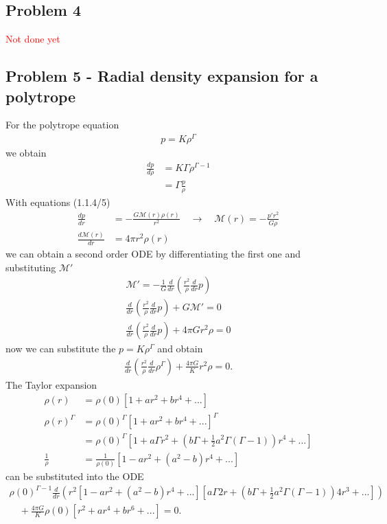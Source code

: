 \documentclass[10pt,a4paper]{book}
\theoremstyle{definition}
\begin{document}
\subsection{Problem 4}
\textcolor{red}{Not done yet}

\subsection{Problem 5 - Radial density expansion for a polytrope}
For the polytrope equation 
\begin{align}
    p=K\rho^\Gamma
\end{align}
we obtain
\begin{align}
    \frac{dp}{d\rho}&=K\Gamma\rho^{\Gamma-1}\\
    &=\Gamma\frac{p}{\rho}
\end{align}
With equations (1.1.4/5)
\begin{align}
    \frac{dp}{dr}   &= -\frac{G\mathcal{M}(r)\rho(r)}{r^2}\quad\rightarrow\quad\mathcal{M}(r)=-\frac{p'r^2}{G\rho}\\
    \frac{d\mathcal{M}(r)}{dr} &= 4\pi r^2\rho(r)
\end{align}
we can obtain a second order ODE by differentiating the first one and substituting $\mathcal{M}'$
\begin{align}
    \mathcal{M}'=-\frac{1}{G}\frac{d}{dr}\left(\frac{r^2}{\rho}\frac{d}{dr}p\right)\\
    \frac{d}{dr}\left(\frac{r^2}{\rho}\frac{d}{dr}p\right)+G\mathcal{M}'=0\\
    \frac{d}{dr}\left(\frac{r^2}{\rho}\frac{d}{dr}p\right)+4\pi Gr^2\rho=0
\end{align}
now we can substitute the $p=K\rho^\Gamma$ and obtain
\begin{align}
    \frac{d}{dr}\left(\frac{r^2}{\rho}\frac{d}{dr}\rho^\Gamma\right)+\frac{4\pi G}{K}r^2\rho=0.
\end{align}
The Taylor expansion 
\begin{align}
    \rho(r)&=\rho(0)\left[1+ar^2+br^4+...\right]\\
    \rho(r)^\Gamma&=\rho(0)^\Gamma\left[1+ar^2+br^4+...\right]^\Gamma\\
    &=\rho(0)^\Gamma\left[1+a\Gamma r^2+\left(b\Gamma+\frac{1}{2}a^2\Gamma(\Gamma-1)\right)r^4+...\right]\\
    \frac{1}{\rho}&=\frac{1}{\rho(0)}\left[1-a r^2+(a^2-b)r^4+...\right]
\end{align}
can be substituted into the ODE
\begin{align}
    \rho(0)^{\Gamma-1}\frac{d}{dr}\left(r^2\left[1-a r^2+(a^2-b)r^4+...\right]\left[a\Gamma 2r+\left(b\Gamma+\frac{1}{2}a^2\Gamma(\Gamma-1)\right)4r^3+...\right]\right)\\
    \quad+\frac{4\pi G}{K}\rho(0)\left[r^2+ar^4+br^6+...\right]=0.
\end{align}
\end{document}
